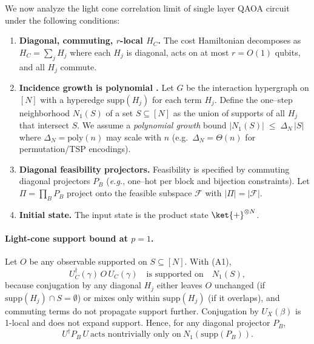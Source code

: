 \documentclass[a4paper,onecolumn,11pt,unpublished]{quantumarticle}
\theoremstyle{remark}
\begin{document}
We now analyze the light cone correlation limit of single layer QAOA circuit under the following conditions:
\begin{enumerate}[label=\textup{(A\arabic*)}, leftmargin=2.0em]
  \item \textbf{Diagonal, commuting, $r$-local $H_C$.} The cost Hamiltonian decomposes as
        \(H_C=\sum_{j}H_j\) where each \(H_j\) is diagonal, acts on at most \(r=O(1)\) qubits,
        and all \(H_j\) commute.
  \item \textbf{Incidence growth is polynomial .}
        Let \(G\) be the interaction hypergraph on \([N]\) with a hyperedge
        \(\mathrm{supp}(H_j)\) for each term \(H_j\).
        Define the one–step neighborhood \(N_1(S)\) of a set \(S\subseteq[N]\) as the union
        of supports of all \(H_j\) that intersect \(S\).
        We assume a \emph{polynomial growth} bound
        \(
          |N_1(S)|\;\le\; \Delta_N\,|S|
        \)
        where \(\Delta_N=\mathrm{poly}(n)\) may scale with \(n\) (e.g.\ \(\Delta_N=\Theta(n)\) for permutation/TSP encodings).
       
  \item \textbf{Diagonal feasibility projectors.}
        Feasibility is specified by commuting diagonal projectors
        \(P_B\) (\emph{e.g.}, one–hot per block and bijection constraints). Let
        \(\Pi=\prod_{B}P_B\) project onto the feasible subspace \(\mathcal F\) with
        \(|\Pi|=|\mathcal F|\).
  \item \textbf{Initial state.}
        The input state is the product state  \(\ket{+}^{\otimes N}\). 
\end{enumerate}

\paragraph{Light-cone support bound at $p=1$.}
Let \(O\) be any observable supported on \(S\subseteq[N]\). With (A1),
\[
  U_C^\dagger(\gamma)\,O\,U_C(\gamma)
  \quad\text{is supported on}\quad N_1(S),
\]
because conjugation by any diagonal \(H_j\) either leaves \(O\) unchanged (if \(\mathrm{supp}(H_j)\cap S=\emptyset\))
or mixes only within \(\mathrm{supp}(H_j)\) (if it overlaps), and commuting terms do not propagate support further.
Conjugation by \(U_X(\beta)\) is 1-local and does not expand support. Hence, for any diagonal projector \(P_B\),
\begin{equation}
  U^\dagger P_B\,U
  \ \text{acts nontrivially only on}\ N_1(\mathrm{supp}(P_B)).
\label{eq:star}
\end{equation}
\end{document}
